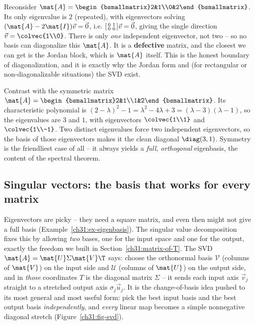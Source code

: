 \begin{example}
\label{ch31:ex-eigenbasis}
Reconsider $\mat{A}=\begin{bsmallmatrix}2&1\\0&2\end{bsmallmatrix}$. Its only
eigenvalue is $2$ (repeated), with eigenvectors solving
$(\mat{A}-2\mat{I})\vec{v}=\vec{0}$, i.e.
$\begin{bsmallmatrix}0&1\\0&0\end{bsmallmatrix}\vec{v}=\vec0$, giving the single
direction $\vec{v}=\colvec{1\\0}$. There is only \emph{one} independent
eigenvector, not two -- so no basis can diagonalize this $\mat{A}$. It is a
\textbf{defective} matrix, and the closest we can get is the Jordan block, which is
$\mat{A}$ itself. This is the honest boundary of diagonalization, and it is exactly
why the Jordan form and (for rectangular or non-diagonalizable situations) the SVD
exist.

Contrast with the symmetric matrix
$\mat{A}=\begin{bsmallmatrix}2&1\\1&2\end{bsmallmatrix}$. Its characteristic
polynomial is $(2-\lambda)^2-1=\lambda^2-4\lambda+3=(\lambda-3)(\lambda-1)$, so the
eigenvalues are $3$ and $1$, with eigenvectors $\colvec{1\\1}$ and $\colvec{1\\-1}$.
Two distinct eigenvalues force two independent eigenvectors, so the basis of those
eigenvectors makes it the clean diagonal $\diag(3,1)$. Symmetry is the friendliest
case of all -- it always yields a \emph{full, orthogonal} eigenbasis, the content
of the spectral theorem.
\end{example}

\subsection{Singular vectors: the basis that works for every matrix}
\label{ch31:svd-basis}

Eigenvectors are picky -- they need a square matrix, and even then might not give
a full basis (Example~\ref{ch31:ex-eigenbasis}). The singular value decomposition
fixes this by allowing \emph{two} bases, one for the input space and one for the
output, exactly the freedom we built in Section~\ref{ch31:matrix-of-T}. The SVD
$\mat{A}=\mat{U}\Sigma\mat{V}\T$ says: choose the orthonormal basis $\mathcal{V}$
(columns of $\mat{V}$) on the input side and $\mathcal{U}$ (columns of $\mat{U}$)
on the output side, and in \emph{those} coordinates $T$ is the diagonal matrix
$\Sigma$ -- it sends each input axis $\vec{v}_j$ straight to a stretched output
axis $\sigma_j\vec{u}_j$. It is the change-of-basis idea pushed to its most general
and most useful form: pick the best input basis and the best output basis
\emph{independently}, and \emph{every} linear map becomes a simple nonnegative
diagonal stretch (Figure~\ref{ch31:fig-svd}).

